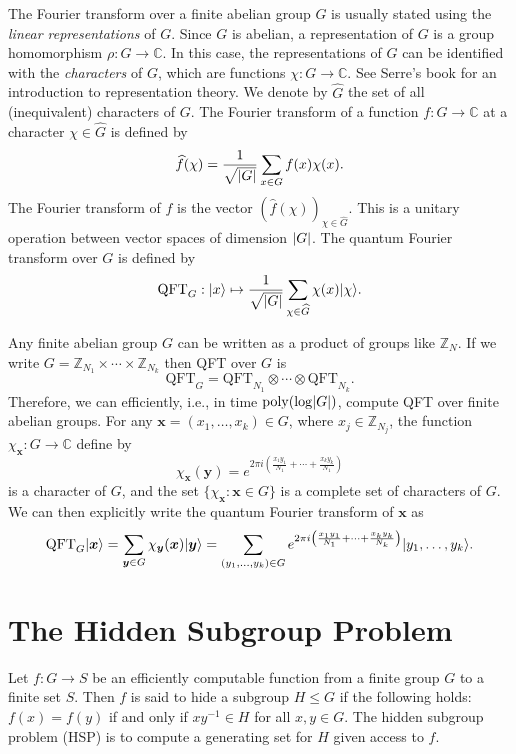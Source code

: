 \documentclass[11pt]{article}
\theoremstyle{plain}
\theoremstyle{definition}
\DeclareMathOperator{\poly}{poly}
\DeclarePairedDelimiter{\abs}{\lvert}{\rvert}
\DeclarePairedDelimiter{\ket}{\lvert}{\rangle}
\def\C{\mathbb{C}}
\def\Z{\mathbb{Z}}
\begin{document}
The Fourier transform over a finite abelian group $G$ is usually stated using the \textit{linear representations} of $G$. Since $G$ is abelian, a representation of $G$ is a group homomorphism $\rho: G \rightarrow \C$. In this case, the representations of $G$ can be identified with the \textit{characters} of $G$, which are functions $\chi: G \rightarrow \C$. See Serre's book \cite{serre1977linear} for an introduction to representation theory. We denote by $\widehat{G}$ the set of all (inequivalent) characters of $G$. The Fourier transform of a function $f: G \rightarrow \C$ at a character $\chi \in \widehat{G}$ is defined by
\[ \widehat{f}(\chi) = \frac{1}{\sqrt{\abs{G}}} \sum_{x \in G} f(x)\chi(x). \]
The Fourier transform of $f$ is the vector $(\widehat{f}(\chi))_{\chi \in \widehat{G}}$. This is a unitary operation between vector spaces of dimension $\abs{G}$. The quantum Fourier transform over $G$ is defined by
\[ \mathrm{QFT}_G: \ket{x} \mapsto \frac{1}{\sqrt{\abs{G}}} \sum_{\chi \in \widehat{G}} \chi(x) \ket{\chi}. \]

Any finite abelian group $G$ can be written as a product of groups like $\Z_N$. If we write $G = \Z_{N_1} \times \cdots \times \Z_{N_k}$ then QFT over $G$ is
\[ \mathrm{QFT}_G = \mathrm{QFT}_{N_1} \otimes \cdots \otimes \mathrm{QFT}_{N_k}.  \]
Therefore, we can efficiently, i.e., in time $\poly(\log \abs{G})$, compute QFT over finite abelian groups. For 
any $\bm{x} = (x_1, \dots, x_k) \in G$, where $x_j \in \Z_{N_j}$, the function $\chi_{\bm{x}}: G \rightarrow \C$ define by
\begin{equation}
\label{equ:char}
	\chi_{\bm{x}}(\bm{y}) = e^{2\pi i \left( \frac{x_1y_1}{N_1} + \cdots + \frac{x_ky_k}{N_1} 
	\right)}
\end{equation}
is a character of $G$, and the set $\{ \chi_{\bm{x}}: \bm{x} \in G \}$ is a complete set of 
characters of $G$. We can then explicitly write the quantum Fourier transform of $\bm{x}$ as
\[ \mathrm{QFT}_G \ket{\bm{x}} = \sum_{\bm{y} \in G} \chi_{\bm{y}}(\bm{x}) \ket{\bm{y}} = 
\sum_{(y_1, \dots, y_k) \in G} e^{2\pi i \left( \frac{x_1y_1}{N_1} + \cdots + \frac{x_ky_k}{N_k} 
\right)} \ket{y_1, \dots, y_k}. \]



\section{The Hidden Subgroup Problem}

Let $f: G \rightarrow S$ be an efficiently computable function from a finite group $G$ to a finite 
set $S$. Then $f$ is said to hide a subgroup $H \le G$ if the following holds: $f(x) = f(y)$ if and 
only if $xy^{-1} \in H$ for all $x, y \in G$. The hidden subgroup problem (HSP) is to compute a 
generating set for $H$ given access to $f$.
\end{document}
